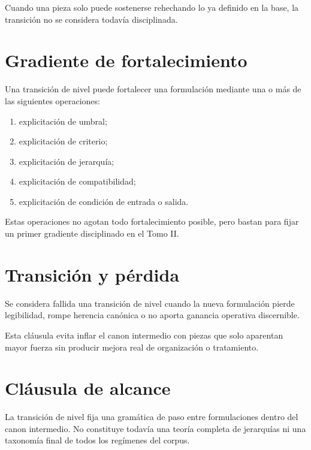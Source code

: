\begin{observation}
Cuando una pieza solo puede sostenerse rehechando lo ya definido en la base, la transición no se considera todavía disciplinada.
\end{observation}

\section{Gradiente de fortalecimiento}
\begin{definition}
Una transición de nivel puede fortalecer una formulación mediante una o más de las siguientes operaciones:
\begin{enumerate}
  \item explicitación de umbral;
  \item explicitación de criterio;
  \item explicitación de jerarquía;
  \item explicitación de compatibilidad;
  \item explicitación de condición de entrada o salida.
\end{enumerate}
\end{definition}

\begin{observation}
Estas operaciones no agotan todo fortalecimiento posible, pero bastan para fijar un primer gradiente disciplinado en el Tomo II.
\end{observation}

\section{Transición y pérdida}
\begin{definition}
Se considera fallida una transición de nivel cuando la nueva formulación pierde legibilidad, rompe herencia canónica o no aporta ganancia operativa discernible.
\end{definition}

\begin{observation}
Esta cláusula evita inflar el canon intermedio con piezas que solo aparentan mayor fuerza sin producir mejora real de organización o tratamiento.
\end{observation}

\section{Cláusula de alcance}
\begin{observation}
La transición de nivel fija una gramática de paso entre formulaciones dentro del canon intermedio. No constituye todavía una teoría completa de jerarquías ni una taxonomía final de todos los regímenes del corpus.
\end{observation}



